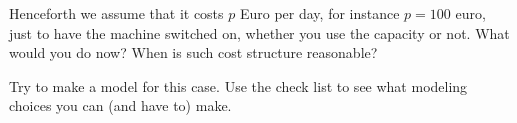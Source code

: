 \begin{exercise}
  Henceforth we assume that it costs $p$ Euro per day, for instance
  $p=100$ euro, just to have the machine switched on, whether you use
  the capacity or not. What would you do now? When is such cost structure reasonable?

\end{exercise}



\begin{exercise}
  Try to make a model for this case.  Use the check list to see what
  modeling choices you can (and have to) make.

\end{exercise}


